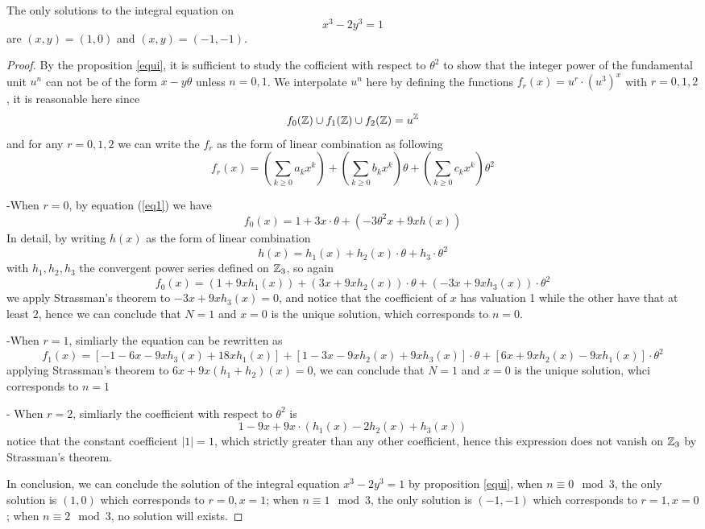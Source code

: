    \begin{theorem} \label{x3-2y3=1}
        The only solutions to the integral equation on
\[
x^{3}-2y^{3}=1
\]
are\/ $(x,y)=(1,0)$ and\/ $(x,y)=(-1,-1)$.

    \begin{proof}
        By the proposition \ref{equi}, it is sufficient to study the cofficient with respect to \(\theta^2\) to show that the integer power of the fundamental unit \(u^n\) can not be of the form \(x-y \theta\) unless \(n=0,1\). We interpolate \(u^n\) here by defining the functions \(f_r(x) = u^{r}\cdot (u^3)^x\) with \(r=0,1,2\), it is reasonable here since
        \[f_0(\mathbb{Z})\cup f_1(\mathbb{Z}) \cup f_2(\mathbb{Z}) = u^{\mathbb{Z}}\]
        and for any \(r=0,1,2\) we can write the \(f_r\) as the form of linear combination as following
         \[f_r(x) = (\sum_{k \geq 0}a_kx^k)+(\sum_{k \geq 0}b_kx^k)\theta + (\sum_{k \geq 0}c_kx^k)\theta^2\]

         -When \(r=0\), by equation (\ref{eq1}) we have
         \[f_0(x) = 1+ 3x\cdot \theta + (-3\theta^2x+9xh(x))\]
         In detail, by writing \(h(x)\) as the form of linear combination
         \[h(x) = h_1(x)+h_2(x)\cdot\theta + h_3 \cdot \theta^2\]
         with \(h_1,h_2,h_3\) the convergent power series defined on \(\mathbb{Z}_3\), so again
         \[f_0(x) = (1+9xh_1(x)) + (3x+9xh_2(x))\cdot \theta + (-3x+9xh_3(x)) \cdot \theta^2\]
         we apply Strassman's theorem to \(-3x+9xh_3(x) = 0\), and notice that the coefficient of \(x\) has valuation 1 while the other have that at least 2, hence we can conclude that \(N=1\) and \(x=0\) is the unique solution, which corresponds to \(n=0\).
         
         -When \(r=1\), simliarly the equation can be rewritten as
         \[f_1(x) = [-1-6x-9xh_3(x)+18xh_1(x)]+[1-3x-9xh_2(x)+9xh_3(x)]\cdot \theta + [6x+9xh_2(x)-9xh_1(x)]\cdot \theta^2\]
         applying Strassman's theorem to \(6x+9x(h_1+h_2)(x) = 0\), we can conclude that \(N=1\) and \(x=0\) is the unique solution, whci corresponds to \(n=1\)

         - When \(r=2\), simliarly the coefficient with respect to \(\theta^2\) is \[1-9x+9x\cdot(h_1(x)-2h_2(x)+h_3(x)) \]
         notice that the constant coefficient \(|1| = 1\), which strictly greater than any other coefficient, hence this expression does not vanish on \(\mathbb{Z}_3\) by Strassman's theorem.

         In conclusion, we can conclude the solution of the integral equation \(x^3-2y^3=1\) by proposition \ref{equi}, when \(n \equiv 0 \mod 3\),  the only solution is \((1,0)\) which corresponds to \(r=0, x=1\); when \(n \equiv 1 \mod 3\), the only solution is \((-1,-1)\) which corresponds to \(r=1,x=0\); when \(n \equiv 2 \mod 3\), no solution will exists.
    \end{proof}
    \end{theorem}


   




